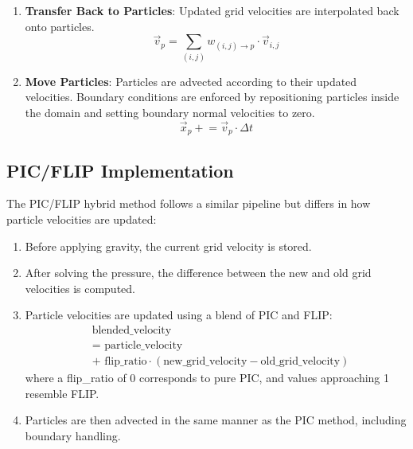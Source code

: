 \begin{enumerate}
\item \textbf{Transfer Back to Particles}: Updated grid velocities are interpolated back onto particles.
\begin{equation}
  \vec{v}_p = \sum_{(i,j)} w_{(i,j) \rightarrow p} \cdot \vec{v}_{i,j}
  \end{equation}

\item \textbf{Move Particles}: Particles are advected according to their updated velocities. Boundary conditions are enforced by repositioning particles inside the domain and setting boundary normal velocities to zero.
\begin{equation}
  \vec{x}_p \mathrel{+}= \vec{v}_p \cdot \Delta t
  \end{equation}
\end{enumerate}

\subsection{PIC/FLIP Implementation}

The PIC/FLIP hybrid method follows a similar pipeline but differs in how particle velocities are updated:

\begin{enumerate}
\item Before applying gravity, the current grid velocity is stored.

\item After solving the pressure, the difference between the new and old grid velocities is computed.

\item Particle velocities are updated using a blend of PIC and FLIP:
\begin{equation}
  \begin{aligned}
  &\text{blended\_velocity} \\
  &= \text{ particle\_velocity} \\
  &+ \text{ flip\_ratio} \cdot (\text{new\_grid\_velocity} - \text{old\_grid\_velocity})
  \end{aligned}
\end{equation}
where a flip\_ratio of 0 corresponds to pure PIC, and values approaching 1 resemble FLIP.

\item Particles are then advected in the same manner as the PIC method, including boundary handling.
\end{enumerate}